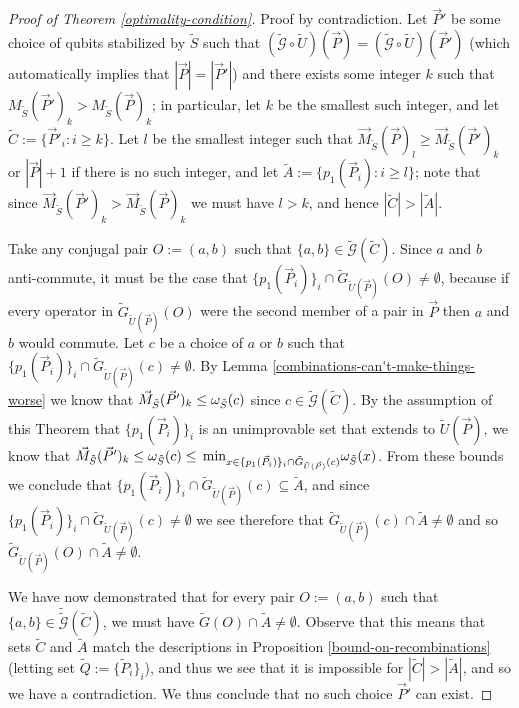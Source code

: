 \documentclass[twocolumn,showpacs,preprintnumbers,amsmath,amssymb,nofootinbib,pra,floatfix]{revtex4-1}
\newcommand{\lst}{\vec}
\newcommand{\set}{\tilde}
\newcommand{\genfun}{\tilde{\mathcal{G}}}
\begin{document}
\begin{proof}[Proof of Theorem \ref{optimality-condition}]
Proof by contradiction.  Let $\lst P'$ be some choice of qubits stabilized by $\set S$ such that $(\genfun\circ\set U)(\lst P)=(\genfun\circ\set U)(\lst P')$ (which automatically implies that $|\lst P|=|\lst P'|$) and there exists some integer $k$ such that $M_{\set S}(\lst P')_k > M_{\set S}(\lst P)_k$;  in particular, let $k$ be the smallest such integer, and let $\set C:=\{\lst P'_i : i \ge k\}$.  Let $l$ be the smallest integer such that $\lst M_{\set S}(\lst P)_l\ge \lst M_{\set S}(\lst P')_k$ or $|\lst P|+1$ if there is no such integer, and let $\set A := \{p_1(\lst P_i) : i \ge l\}$; note that since $\lst M_{\set S}(\lst P')_k > \lst M_{\set S}(\lst P)_k$ we must have $l>k$, and hence $|\set C| > |\set A|$.

Take any conjugal pair $O:=(a,b)$ such that $\{a,b\}\in\genfun(\set C)$.  Since $a$ and $b$ anti-commute, it must be the case that $\{p_1(\lst P_i)\}_i\cap \set G_{\set U(\lst P)}(O)\ne\emptyset$, because if every operator in $\set G_{\set U(\lst P)}(O)$ were the second member of a pair in $\lst P$ then $a$ and $b$ would commute.  Let $c$ be a choice of $a$ or $b$ such that $\{p_1(\lst P_i)\}_i\cap \set G_{\set U(\lst P)}(c)\ne\emptyset$.  By Lemma \ref{combinations-can't-make-things-worse} we know that $\lst M_{\set S}(\lst P')_k\le\om_{\set S}(c)$ since $c\in\genfun(\set C)$.  By the assumption of this Theorem that $\{p_1(\lst P_i)\}_i$ is an unimprovable set that extends to $\set U(\lst P)$, we know that $\lst M_{\set S}(\lst P')_k \le \om_{\set S}(c)\le\min_{x\in\{p_1(\lst P_i)\}_i\cap \set G_{\set U(\lst P)}(c)} \om_{\set S}(x)$.  From these bounds we conclude that $\{p_1(\lst P_i)\}_i\cap \set G_{\set U(\lst P)}(c)\subseteq \set A$, and since $\{p_1(\lst P_i)\}_i\cap \set G_{\set U(\lst P)}(c)\ne\emptyset$ we see therefore that $\set G_{\set U(\lst P)}(c)\cap\set A\ne\emptyset$ and so $\set G_{\set U(\lst P)}(O)\cap\set A\ne\emptyset$.

We have now demonstrated that for every pair $O:=(a,b)$ such that $\{a,b\}\in\set \genfun(\set C)$, we must have $\set G(O)\cap\set A \ne\emptyset$.  Observe that this means that sets $\set C$ and $\set A$ match the descriptions in Proposition \ref{bound-on-recombinations} (letting set $\set Q:=\{\set P_i\}_i$), and thus we see that it is impossible for $|\set C|>|\set A|$, and so we have a contradiction.  We thus conclude that no such choice $\lst P'$ can exist.
\end{proof}
\end{document}
